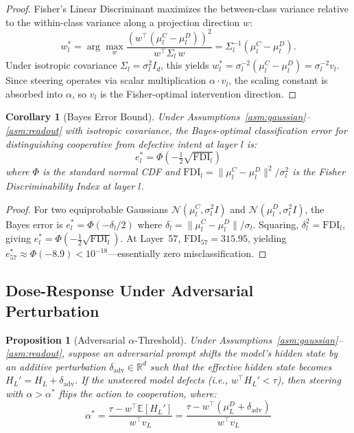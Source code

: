 \documentclass{article}
\newtheorem{proposition}{Proposition}
\newtheorem{corollary}{Corollary}
\begin{document}
\begin{proof}
Fisher's Linear Discriminant maximizes the between-class variance relative to the within-class variance along a projection direction $w$:
\[
w_l^* = \arg\max_w \frac{(w^\top (\mu_l^C - \mu_l^D))^2}{w^\top \Sigma_l\, w} = \Sigma_l^{-1}(\mu_l^C - \mu_l^D).
\]
Under isotropic covariance $\Sigma_l = \sigma_l^2 I_d$, this yields $w_l^* = \sigma_l^{-2}(\mu_l^C - \mu_l^D) = \sigma_l^{-2} v_l$. Since steering operates via scalar multiplication $\alpha \cdot v_l$, the scaling constant is absorbed into $\alpha$, so $v_l$ is the Fisher-optimal intervention direction.
\end{proof}

\begin{corollary}[Bayes Error Bound]
\label{cor:bayes}
Under Assumptions~\ref{asm:gaussian}--\ref{asm:readout} with isotropic covariance, the Bayes-optimal classification error for distinguishing cooperative from defective intent at layer $l$ is:
\[
e_l^* = \Phi\!\left(-\tfrac{1}{2}\sqrt{\text{FDI}_l}\right)
\]
where $\Phi$ is the standard normal CDF and $\text{FDI}_l = \|\mu_l^C - \mu_l^D\|^2 / \sigma_l^2$ is the Fisher Discriminability Index at layer $l$.
\end{corollary}

\begin{proof}
For two equiprobable Gaussians $\mathcal{N}(\mu_l^C, \sigma_l^2 I)$ and $\mathcal{N}(\mu_l^D, \sigma_l^2 I)$, the Bayes error is $e_l^* = \Phi(-\delta_l / 2)$ where $\delta_l = \|\mu_l^C - \mu_l^D\| / \sigma_l$. Squaring, $\delta_l^2 = \text{FDI}_l$, giving $e_l^* = \Phi(-\tfrac{1}{2}\sqrt{\text{FDI}_l})$. At Layer~57, $\text{FDI}_{57} = 315.95$, yielding $e_{57}^* \approx \Phi(-8.9) < 10^{-18}$---essentially zero misclassification.
\end{proof}

\subsection{Dose-Response Under Adversarial Perturbation}

\begin{proposition}[Adversarial $\alpha$-Threshold]
\label{prop:dose}
Under Assumptions~\ref{asm:gaussian}--\ref{asm:readout}, suppose an adversarial prompt shifts the model's hidden state by an additive perturbation $\delta_\text{adv} \in \mathbb{R}^d$ such that the effective hidden state becomes $H_L' = H_L + \delta_\text{adv}$. If the unsteered model defects (i.e., $w^\top H_L' < \tau$), then steering with $\alpha > \alpha^*$ flips the action to cooperation, where:
\[
\alpha^* = \frac{\tau - w^\top \mathbb{E}[H_L'] }{w^\top v_L} = \frac{\tau - w^\top(\mu_L^D + \delta_\text{adv})}{w^\top v_L}
\]
\end{proposition}
\end{document}
